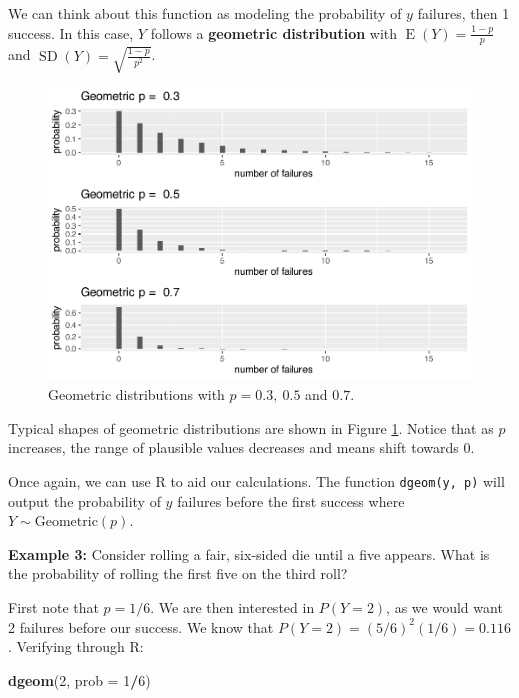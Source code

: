 \documentclass[
]{krantz}
\newenvironment{Shaded}{\begin{snugshade}}{\end{snugshade}}
\newcommand{\AttributeTok}[1]{\textcolor[rgb]{0.27,0.27,0.27}{#1}}
\newcommand{\DecValTok}[1]{\textcolor[rgb]{0.06,0.06,0.06}{#1}}
\newcommand{\FunctionTok}[1]{\textcolor[rgb]{0.27,0.27,0.27}{\textbf{#1}}}
\newcommand{\NormalTok}[1]{#1}
\newcommand{\SpecialCharTok}[1]{\textcolor[rgb]{0.43,0.43,0.43}{\textbf{#1}}}
\newcommand{\E}{\operatorname{E}}
\newcommand{\SD}{\operatorname{SD}}
\begin{document}
We can think about this function as modeling the probability of \(y\) failures, then 1 success. In this case, \(Y\) follows a \textbf{geometric distribution}  with \(\E(Y) = \frac{1-p}p\) and \(\SD(Y) = \sqrt{\frac{1-p}{p^2}}\).



\begin{figure}

{\centering \includegraphics[width=0.6\linewidth]{bookdown-BeyondMLR_files/figure-latex/multGeo-1} 

}

\caption{Geometric distributions with \(p = 0.3,\ 0.5\) and \(0.7\).}\label{fig:multGeo}
\end{figure}

Typical shapes of geometric distributions are shown in Figure \ref{fig:multGeo}. Notice that as \(p\) increases, the range of plausible values decreases and means shift towards 0.

Once again, we can use R to aid our calculations. The function \texttt{dgeom(y,\ p)} will output the probability of \(y\) failures before the first success where \(Y \sim \textrm{Geometric}(p)\).

\textbf{Example 3:} Consider rolling a fair, six-sided die until a five appears. What is the probability of rolling the first five on the third roll?

First note that \(p = 1/6\). We are then interested in \(P(Y=2)\), as we would want 2 failures before our success. We know that \(P(Y=2) = (5/6)^2(1/6) = 0.116\). Verifying through R:

\begin{Shaded}
\begin{Highlighting}[]
\FunctionTok{dgeom}\NormalTok{(}\DecValTok{2}\NormalTok{, }\AttributeTok{prob =} \DecValTok{1}\SpecialCharTok{/}\DecValTok{6}\NormalTok{)}
\end{Highlighting}
\end{Shaded}
\end{document}
